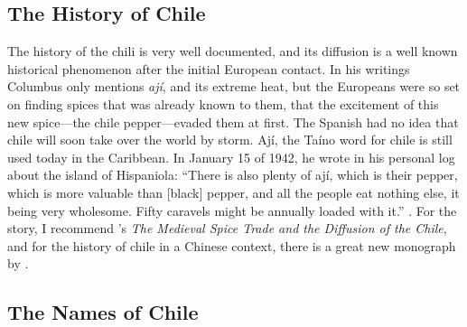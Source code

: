 \subsection{The History of Chile}

The history of the chili is very well documented, and its diffusion is a well known historical phenomenon after the initial European contact. In his writings Columbus only mentions \textit{ají}, and its extreme heat, but the Europeans were so set on finding spices that was already known to them, that the excitement of this new spice---the chile pepper---evaded them at first. The Spanish had no idea that chile will soon take over the world by storm. Ají, the Taíno word for chile is still used today in the Caribbean. In January 15 of 1942, he wrote in his personal log about the island of Hispaniola: ``There is also plenty of ají, which is their pepper, which is more valuable than [black] pepper, and all the people eat nothing else, it being very wholesome. Fifty caravels might be annually loaded with it.'' \autocites[11]{turner_spice_2004}. For the story, I recommend \textcite{wright_medieval_2007}'s \textit{The Medieval Spice Trade and the Diffusion of the Chile}, and for the history of chile in a Chinese context, there is a great new monograph by \textcite[]{dott_chile_2020}.






\subsection{The Names of Chile}

